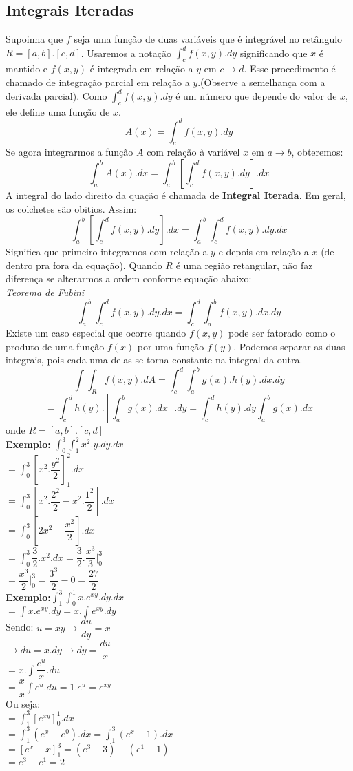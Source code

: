 \documentclass{article}
\begin{document}
		\subsection{Integrais Iteradas}
			Supoinha que $f$ seja uma função de duas variáveis que é integrável no retângulo $R = [a,b].[c,d]$. Usaremos a notação $\int_c^d f(x,y).dy$ significando que $x$ é mantido e $f(x,y)$ é integrada em relação a $y$ em $c \to d$. Esse procedimento é chamado de integração parcial em relação a $y$.(Observe a semelhança com a derivada parcial). Como $\int_c^d f(x,y).dy$ é um número que depende do valor de $x$, ele define uma função de $x$.
			$$A(x) = \int _c^d f(x,y).dy$$
			Se agora integrarmos a função $A$ com relação à variável $x$ em $a \to b$, obteremos:
			$$\int_a^b A(x).dx = \int_a^b [\int_c^d f(x,y).dy].dx$$
			A integral do lado direito da quação é chamada de \textbf{Integral Iterada}. Em geral, os colchetes são obitios. Assim:
			$$\int_a^b [\int_c^d f(x,y).dy].dx=\int_a^b \int_c^d f(x,y).dy.dx$$
			Significa que primeiro integramos com relação a $y$ e depois em relação a $x$ (de dentro pra fora da equação). Quando $R$ é uma região retangular, não faz diferença se alterarmos a ordem conforme equação abaixo:
			\\\textit{Teorema de Fubini}
			$$\int_a^b \int_c^d f(x,y).dy.dx = \int_c^d \int_a^b f(x,y).dx.dy$$
			Existe um caso especial que ocorre quando $f(x,y)$ pode ser fatorado como o produto de uma função $f(x)$ por uma função $f(y)$. Podemos separar as duas integrais, pois cada uma delas se torna constante na integral da outra.
			$$\int \int_R f(x,y).dA = \int_c^d\int_a^b g(x).h(y).dx.dy$$
			$$= \int_c^dh(y).[\int_a^bg(x).dx].dy = \int_c^dh(y).dy \int_a^bg(x).dx$$
			onde $R = [a,b].[c,d]$\\
			\textbf{Exemplo:} $\int_0^3\int_1^2x^2.y.dy.dx$\\
			$=\int_0^3[x^2.\dfrac{y^2}{2}]_1^2.dx$\\
			$=\int_0^3[x^2.\dfrac{2^2}{2}-x^2.\dfrac{1^2}{2}].dx$\\
			$= \int_0^3[2x^2-\dfrac{x^2}{2}].dx$\\
			$= \int_0^3\dfrac{3}{2}.x^2.dx = \dfrac{3}{2}.\dfrac{x^3}{3}|_0^3$\\
			$=\dfrac{x^3}{2}|_0^3 = \dfrac{3^3}{2}-0 = \dfrac{27}{2}$\\
			\textbf{Exemplo:}$\int_1^3\int_0^1 x.e^{xy}.dy.dx$\\
			$=\int x.e^{xy}.dy = x.\int e^{xy}.dy$\\
			Sendo: $u=xy \to \dfrac{du}{dy}=x$\\
			$\to du = x.dy \to dy = \dfrac{du}{x}$\\
			$=x.\int	 \dfrac{e^u	}{x}.du$\\
			$=\dfrac{x}{x}\int e^u.du = 1.e^u = e^{xy}$\\
			Ou seja:\\
			$=\int_1^3[e^{xy}]_0^1.dx$\\
			$=\int_1^3(e^x-e^0).dx = \int_1^3(e^x-1).dx$\\
			$=[e^x-x]_1^3 = (e^3-3)-(e^1-1)$\\
			$=e^3-e^1=2$
\end{document}

